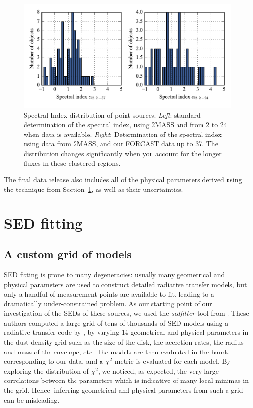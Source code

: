 \begin{figure}[!h]
\begin{center}
\includegraphics[width=\textwidth]{Figures/SpectralIndex.pdf}
\vspace{-1cm}
\caption[Spectral Index distribution of point sources]{Spectral Index distribution of point sources. \textit{Left}: standard determination of the spectral index, using 2MASS and \Spitzer from \SI{2}{\micron} to \SI{24}{\micron}, when data is available. \textit{Right}: Determination of the spectral index using data from 2MASS, \Spitzer and our FORCAST data up to \SI{37}{\micron}. The distribution changes significantly when you account for the longer fluxes in these clustered regions.}
\label{fig:SpectralIndex}
\end{center}
\end{figure}

The final data release also includes all of the physical parameters derived using the technique from Section~\ref{sec:SEDFitting}, as well as their uncertainties.
																							
\section{SED fitting}
\label{sec:SEDFitting}
\subsection{A custom grid of models}

SED fitting is prone to many degeneracies: usually many geometrical and physical parameters are used to construct detailed radiative transfer models, but only a handful of measurement points are available to fit, leading to a dramatically under-constrained problem. As our starting point of our investigation of the SEDs of these sources, we used the \textit{sedfitter} tool from \citep{Robitaille:2006cb}. These authors computed a large grid of tens of thousands of SED models using a radiative transfer code by \citep{Whitney:2003ke}, by varying 14 geometrical and physical parameters in the dust density grid such as the size of the disk, the accretion rates, the radius and mass of the envelope, etc. The models are then evaluated in the bands corresponding to our data, and a $\chi^2$ metric is evaluated for each model. By exploring the distribution of $\chi^2$, we noticed, as expected, the very large correlations between the parameters which is indicative of many local minimas in the grid. Hence, inferring geometrical and physical parameters from such a grid can be misleading.

